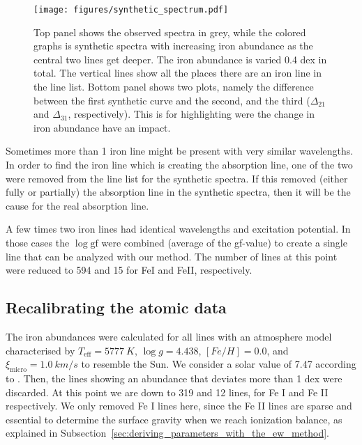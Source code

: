 \documentclass{aa}
\begin{document}
\begin{figure}[tpb]
    \centering
    \texttt{[image: figures/synthetic\_spectrum.pdf]}
    \caption{Top panel shows the observed spectra in grey, while
        the colored graphs is synthetic spectra with increasing iron
        abundance as the central two lines get deeper. The iron abundance
        is varied 0.4 dex in total. The vertical lines show all the places
        there are an iron line in the line list. Bottom panel shows
        two plots, namely the difference between the first synthetic curve
        and the second, and the third ($\Delta_{21}$ and $\Delta_{31}$,
        respectively). This is for highlighting were the change in iron
        abundance have an impact.}
    \label{fig:synthesis}
\end{figure}


Sometimes more than 1 iron line might be present with very similar
wavelengths. In order to find the iron line which is creating the
absorption line, one of the two were removed from the line list for
the synthetic spectra. If this removed (either fully or partially) the
absorption line in the synthetic spectra, then it will be the cause for
the real absorption line.

A few times two iron lines had identical wavelengths and excitation
potential. In those cases the $\log \mathrm{gf}$ were combined (average
of the gf-value) to create a single line that can be analyzed with our
method. The number of lines at this point were reduced to 594 and 15 for
FeI and FeII, respectively.


\subsection{Recalibrating the atomic data}
\label{ssub:Recalibrating-the-atomic-data}

The iron abundances were calculated for all lines with an atmosphere
model characterised by $T_\mathrm{eff}=\SI{5777}{K}$, $\log g =
4.438$, $[Fe/H] = 0.0$, and $\xi_\mathrm{micro} = \SI{1.0}{km/s}$
to resemble the Sun. We consider a solar value of 7.47 according to
\cite{Gonzales2000}. Then, the lines showing an abundance that deviates
more than 1 dex were discarded. At this point we are down to 319 and
12 lines, for Fe I and Fe II respectively. We only removed Fe I lines
here, since the Fe II lines are sparse and essential to determine the
surface gravity when we reach ionization balance, as explained in
Subsection~\ref{sec:deriving_parameters_with_the_ew_method}.
\end{document}
